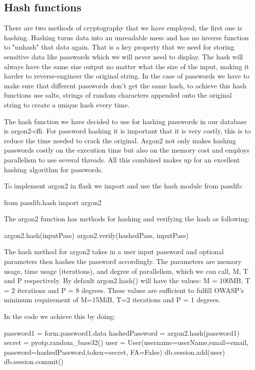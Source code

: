 \subsection{Hash functions}
There are two methods of cryptography that we have employed, the first one is hashing. Hashing turns data into an unreadable mess and has no inverse function to "unhash" that data again. That is a key property that we need for storing sensitive data like passwords which we will never need to display. The hash will always have the same size output no matter what the size of the input, making it harder to reverse-engineer the original string. In the case of passwords we have to make sure that different passwords don't get the same hash, to achieve this hash functions use salts, strings of random characters appended onto the original string to create a unique hash every time. 

The hash function we have decided to use for hashing passwords in our database is argon2-cffi. For password hashing it is important that it is very costly, this is to reduce the time needed to crack the original. Argon2 not only makes hashing passwords costly on the execution time but also on the memory cost and employs parallelism to use several threads. All this combined makes up for an excellent hashing algorithm for passwords.

To implement argon2 in flask we import and use the hash module from passlib:
\begin{python}
from passlib.hash import argon2
\end{python}
The argon2 function has methods for hashing and verifying the hash as following:
\begin{python}
argon2.hash(inputPass)
argon2.verify(hashedPass, inputPass)
\end{python}

The hash method for argon2 takes in a user input password and optional parameters then hashes the password accordingly. The parameters are memory usage, time usage (iterations), and degree of parallelism, which we can call, M, T and P respectively. By default argon2.hash() will have the values: M = 100MB, T = 2 iterations and P = 8 degrees. These values are sufficient to fulfill OWASP's minimum requirement of M=15MiB, T=2 iterations and P = 1 degrees. 

In the code we achieve this by doing:

\begin{python}
password1 = form.password1.data
hashedPassword = argon2.hash(password1)
secret = pyotp.random_base32()
user = User(username=userName,email=email,
    password=hashedPassword,token=secret, FA=False)
db.session.add(user)
db.session.commit()
\end{python}

